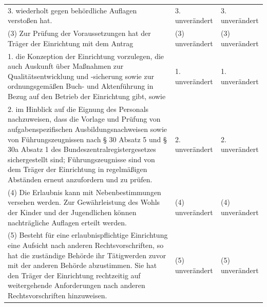 \documentclass[10pt,a4paper,landscape]{article}
\begin{document}
\begin{longtable}{|L{8.2cm}|L{8.2cm}|L{8.2cm}|}
\hhline{|---|}
3.  \newline wiederholt gegen behördliche Auflagen  \newline verstoßen hat. & 3. unverändert & 3. unverändert \\
\hhline{|---|}
(3) Zur Prüfung der Voraussetzungen hat  \newline der Träger der Einrichtung mit dem Antrag & (3) unverändert & (3) unverändert \\
\hhline{|---|}
1.  \newline die Konzeption der Einrichtung vorzulegen,  \newline die auch Auskunft über Maßnahmen zur  \newline Qualitätsentwicklung und -sicherung sowie  \newline zur ordnungsgemäßen Buch- und  \newline Aktenführung in Bezug auf den Betrieb der  \newline Einrichtung gibt, sowie & 1. unverändert & 1. unverändert \\
\hhline{|---|}
2.  \newline im Hinblick auf die Eignung des Personals  \newline nachzuweisen, dass die Vorlage und  \newline Prüfung von aufgabenspezifischen  \newline Ausbildungsnachweisen sowie von  \newline Führungszeugnissen nach \S{} 30 Absatz 5  \newline und \S{} 30a Absatz 1 des  \newline Bundeszentralregistergesetzes  \newline sichergestellt sind; Führungszeugnisse  \newline sind von dem Träger der Einrichtung in  \newline regelmäßigen Abständen erneut  \newline anzufordern und zu prüfen. & 2. unverändert & 2. unverändert \\
\hhline{|---|}
(4) Die Erlaubnis kann mit  \newline Nebenbestimmungen versehen werden.  \newline Zur Gewährleistung des Wohls der Kinder  \newline und der Jugendlichen können  \newline nachträgliche Auflagen erteilt werden. & (4) unverändert & (4) unverändert \\
\hhline{|---|}
(5) Besteht für eine erlaubnispflichtige  \newline Einrichtung eine Aufsicht nach anderen  \newline Rechtsvorschriften, so hat die zuständige  \newline Behörde ihr Tätigwerden zuvor mit der  \newline anderen Behörde abzustimmen. Sie hat  \newline den Träger der Einrichtung rechtzeitig auf  \newline weitergehende Anforderungen nach  \newline anderen Rechtsvorschriften hinzuweisen. & (5) unverändert & (5) unverändert \\

\end{longtable}
\end{document}
